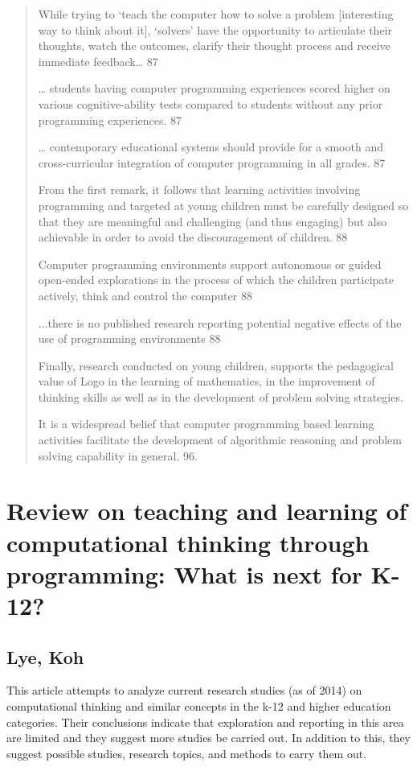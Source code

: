 \documentclass[12pt]{extarticle}
\begin{document}
{\begin{quotation}
    While trying to ‘teach the computer how to solve a problem [interesting way to think about it], ‘solvers’ have the opportunity to articulate their thoughts, watch the outcomes, clarify their thought process and receive immediate feedback… 87
    
    … students having computer programming experiences scored higher on various cognitive-ability tests compared to students without any prior programming experiences. 	87
    
    … contemporary educational systems should provide for a smooth and cross-curricular integration of computer programming in all grades.	87
    
    From the first remark, it follows that learning activities involving programming and targeted at young children must be carefully designed so that they are meaningful and challenging (and thus engaging) but also achievable in order to avoid the discouragement of children. 88
    
    Computer programming environments support autonomous or guided open-ended explorations in the process of which the children participate actively, think and control the computer	88
    
    ...there is no published research reporting potential negative effects of the use of programming environments	88
    
    Finally, research conducted on young children, supports the pedagogical value of Logo in the learning of mathematics, in the improvement of thinking skills as well as in the development of problem solving strategies.
    
    It is a widespread belief that computer programming based learning activities facilitate the development of algorithmic reasoning and problem solving capability in general. 	96.

\end{quotation}    

\section*{Review on teaching and learning of computational thinking through programming: What is next for K-12?} 
\subsection*{Lye, Koh}
This article attempts to analyze current research studies (as of 2014) on computational thinking and similar concepts in the k-12 and higher education categories. Their conclusions indicate that exploration and reporting in this area are limited and they suggest more studies be carried out. In addition to this, they suggest possible studies, research topics, and methods to carry them out. 
\begin{quote}
    

\end{quote}}
\end{document}
